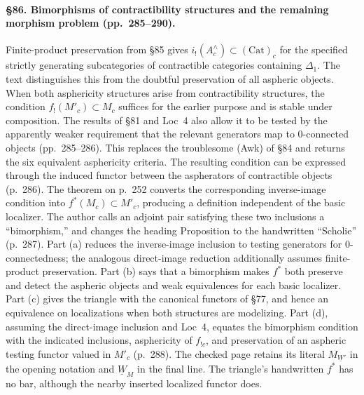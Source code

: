 \paragraph{\S86. Bimorphisms of contractibility structures and the remaining morphism problem (pp.\ 285--290).}
Finite-product preservation from \S85 gives $i_!(A^\wedge_c)\subset(\mathrm{Cat})_c$ for the specified strictly generating subcategories of contractible categories containing $\Delta_1$. The text distinguishes this from the doubtful preservation of all aspheric objects. When both asphericity structures arise from contractibility structures, the condition $f_!(M'_c)\subset M_c$ suffices for the earlier purpose and is stable under composition. The results of \S81 and Loc~4 also allow it to be tested by the apparently weaker requirement that the relevant generators map to 0-connected objects (pp.\ 285--286). This replaces the troublesome (Awk) of \S84 and returns the six equivalent asphericity criteria. The resulting condition can be expressed through the induced functor between the aspherators of contractible objects (p.\ 286).
The theorem on p.\ 252 converts the corresponding inverse-image condition into $f^*(M_c)\subset M'_c$, producing a definition independent of the basic localizer. The author calls an adjoint pair satisfying these two inclusions a “bimorphism,” and changes the heading Proposition to the handwritten “Scholie” (p.\ 287). Part (a) reduces the inverse-image inclusion to testing generators for 0-connectedness; the analogous direct-image reduction additionally assumes finite-product preservation. Part (b) says that a bimorphism makes $f^*$ both preserve and detect the aspheric objects and weak equivalences for each basic localizer. Part (c) gives the triangle with the canonical functors of \S77, and hence an equivalence on localizations when both structures are modelizing. Part (d), assuming the direct-image inclusion and Loc~4, equates the bimorphism condition with the indicated inclusions, asphericity of $f_{!c}$, and preservation of an aspheric testing functor valued in $M'_c$ (p.\ 288). The checked page retains its literal $M_{\underline W'}$ in the opening notation and $\underline W_M$ in the final line. The triangle's handwritten $f^*$ has no bar, although the nearby inserted localized functor does.
